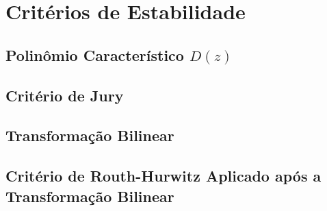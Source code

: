 \chapter{Critérios de Estabilidade}
\label{cap:criterios}

\section{Polinômio Característico \texorpdfstring{$D(z)$}{D(z)}}


\section{Critério de Jury}


\section{Transformação Bilinear}


\section{Critério de Routh-Hurwitz Aplicado após a Transformação Bilinear}

